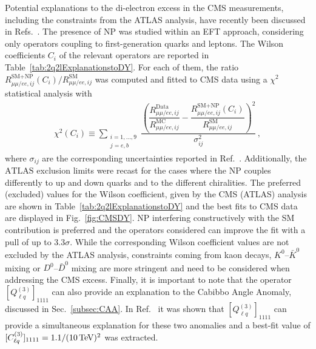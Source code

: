 \documentclass[10pt]{article}
\begin{document}
Potential explanations to the di-electron excess in the CMS measurements, including the constraints from the ATLAS analysis, have recently been discussed in Refs.~\cite{Crivellin:2021egp,Crivellin:2021rbf,Crivellin:2021bkd}. The presence of NP was studied within an EFT approach, considering only operators coupling to first-generation quarks and leptons. The Wilson coefficients $C_i$ of the relevant operators are reported in Table~\ref{tab:2q2lExplanationstoDY}. For each of them, the ratio $R_{\mu \mu / ee, ij}^{\text{SM+NP}}(C_i) \big / R_{\mu \mu / ee, ij}^{\text{SM}}$ was computed and fitted to CMS data using a $\chi^2$ statistical analysis with 
%
\begin{equation}
\begin{aligned}
\chi^2(C_{i}) \equiv \sum_{\substack{i=1, \dots, 9 \\ j = e,b}}\dfrac{\left(\dfrac{R_{\mu \mu / e e, ij}^{\text{Data}}}{R_{\mu \mu / e e, ij}^{\text{MC}}} - \dfrac{R_{\mu \mu / e e, ij}^{\text{SM+NP}}(C_{i})}{R_{\mu \mu / ee, ij}^{\text{SM}}} \right)^2}{\sigma_{ij}^2} \,,
\end{aligned}
\end{equation}
%
where $\sigma_{ij}$ are the corresponding uncertainties reported in Ref.~\cite{Sirunyan:2021khd}. Additionally, the $\text{ATLAS}$ exclusion limits were recast for the cases where the NP couples differently to up and down quarks and to the different chiralities. The preferred (excluded) values for the Wilson coefficient, given by the CMS (ATLAS) analysis are shown in Table~\ref{tab:2q2lExplanationstoDY} and the best fits to CMS data are displayed in Fig.~\ref{fig:CMSDY}. NP interfering constructively with the SM contribution is preferred and the operators considered can improve the fit with a pull of up to $3.3 \sigma$. While the corresponding Wilson coefficient values are not excluded by the ATLAS analysis, constraints coming from kaon decays,  $K^0$--$\bar{K}^0$ mixing or $D^0$--$\bar{D}^0$ mixing are more stringent and need to be considered when addressing the CMS excess. Finally, it is important to note that the operator $[Q_{\ell q}^{(3)}]_{1111}$ can also provide an explanation to the Cabibbo Angle Anomaly, discussed in Sec.~\ref{subsec:CAA}. In Ref.~\cite{Crivellin:2021rbf} it was shown that $[Q_{\ell q}^{(3)}]_{1111}$ can provide a simultaneous explanation for these two anomalies and a best-fit value of $[C_{\ell q}^{(3)}]_{1111}=1.1/(10\, \rm TeV)^2$ was extracted.
%
\end{document}
